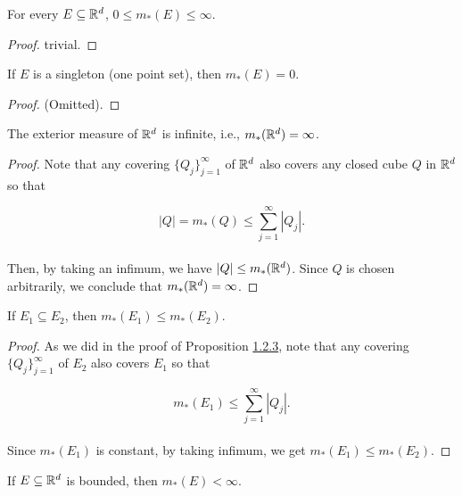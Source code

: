 \documentclass[12pt, a4paper, openany, twoside]{book}
\theoremstyle{definition}
\theoremstyle{remark}
\theoremstyle{plain}
\numberwithin{equation}{section}
\begin{document}
\vspace{5mm}
\begin{tcolorbox}[colback=yellow!10!white,colframe=brown!75!black,title=Proposition 1.2.1]\label{Proposition 1.2.1}
    For every $E\subseteq{\mathbb {R}}^d$, $0\leq m_*(E)\leq\infty$.
\end{tcolorbox}
\begin{proof}
    trivial.
\end{proof}
\vspace{5mm}
\begin{tcolorbox}[colback=yellow!10!white,colframe=brown!75!black,title=Proposition 1.2.2]\label{Proposition 1.2.2}
    If $E$ is a singleton (one point set), then $m_*(E)=0$.
\end{tcolorbox}
\begin{proof}
    (Omitted).
\end{proof}
\begin{tcolorbox}[colback=yellow!10!white,colframe=brown!75!black,title=Proposition 1.2.3]\label{Proposition 1.2.3}
    The exterior measure of ${\mathbb {R}}^d$ is infinite, i.e., $m_*({\mathbb {R}}^d)=\infty$.
\end{tcolorbox}
\begin{proof}
    Note that any covering $\{Q_j\}_{j=1}^{\infty}$ of ${\mathbb {R}}^d$ also covers any closed cube $Q$ in ${\mathbb {R}}^d$ so that

    \[|Q|=m_*(Q)\leq \sum_{j=1}^{\infty}{|Q_j|}.\]
    \\
    Then, by taking an infimum, we have $|Q|\leq m_*({\mathbb {R}}^d)$. Since $Q$ is chosen arbitrarily, we conclude that $m_*({\mathbb {R}}^d)=\infty$.
\end{proof}
\vspace{5mm}
\begin{tcolorbox}[colback=yellow!10!white,colframe=red!75!black,title=Theorem 1.2.4 (Monotonicity)]\label{Theorem 1.2.4}
    If $E_1\subseteq E_2$, then $m_*(E_1)\leq m_*(E_2)$.
\end{tcolorbox}
\begin{proof}
    As we did in the proof of Proposition \hyperref[Proposition 1.2.3]{1.2.3}, note that any covering $\{Q_j\}_{j=1}^{\infty}$ of $E_2$ also covers $E_1$ so that 

    \[m_*(E_1)\leq \sum_{j=1}^{\infty}{|Q_j|}.\]
    \\
    Since $m_*(E_1)$ is constant, by taking infimum, we get $m_*(E_1)\leq m_*(E_2)$.
\end{proof}
\vspace{5mm}
\begin{tcolorbox}[colback=yellow!10!white,colframe=red!75!black,title=Corollary 1.2.5]\label{Corollary 1.2.5}
    If $E\subseteq{\mathbb {R}}^d$ is bounded, then $m_*(E)<\infty$.
\end{tcolorbox}
\end{document}
